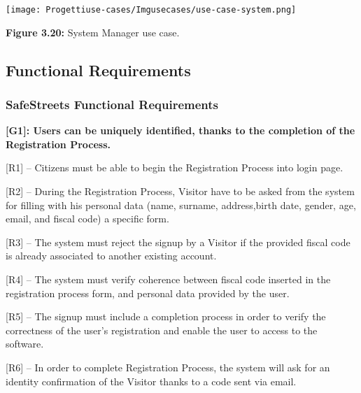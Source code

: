 \documentclass[12pt]{article}
\begin{document}
\begin{center}
\texttt{[image: Progettiuse-cases/Imgusecases/use-case-system.png]}                  

\textbf{Figure 3.20:} System Manager use case. 
\end{center}

\newpage

\subsection{Functional Requirements}
\vspace{5mm}

\subsubsection{SafeStreets Functional Requirements}
\vspace{2mm}%
\textbf{[G1]: Users can be uniquely identified, thanks to the completion of the Registration Process.}
\vspace{2mm}
\begin{flushleft}


[R1] -- Citizens must be able to begin the Registration Process into login page.
\vspace{2mm}

[R2] – During the Registration Process, Visitor have to be asked from the system for filling with his personal data (name, surname, address,birth date, gender, age, email, and fiscal code) a specific form.
\vspace{2mm}

[R3] – The system must reject the signup by a Visitor if the provided fiscal code is already associated to another existing account.
\vspace{2mm}

[R4] – The system must verify coherence between fiscal code inserted in the registration process form, and personal data provided by the user.
\vspace{2mm}

[R5] – The signup must include a completion process in order to verify the correctness of the user’s registration and enable the user to access to the software.
\vspace{2mm}

[R6] -- In order to complete Registration Process, the system will ask for an identity confirmation of the Visitor thanks to a code sent via email.
\end{flushleft}
\end{document}
